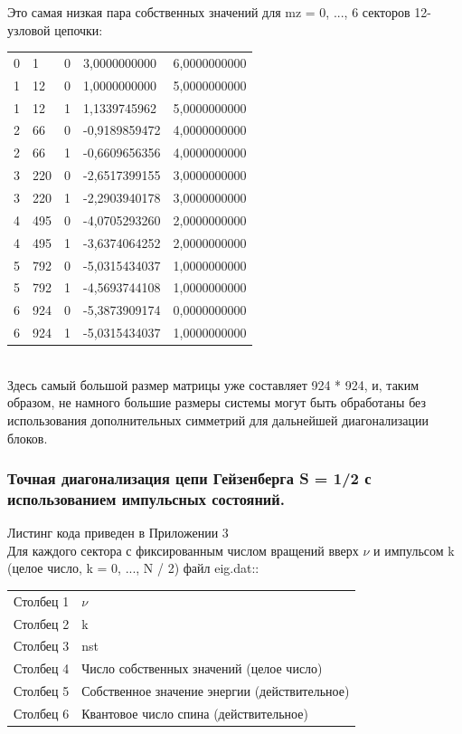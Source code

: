 \documentclass[11pt]{article}
\begin{document}
Это самая низкая пара собственных значений для mz = 0, ..., 6 секторов 12-узловой цепочки: \\
\begin{tabular}{lllll}
    0 & 1 & 0 & 3,0000000000 & 6,0000000000 \\
    1 & 12 & 0 & 1,0000000000 & 5,0000000000 \\
    1 & 12 & 1 & 1,1339745962 & 5,0000000000 \\
    2 & 66 & 0 & -0,9189859472 & 4,0000000000 \\
    2 & 66 & 1 & -0,6609656356 & 4,0000000000 \\
    3 & 220 & 0 & -2,6517399155 & 3,0000000000 \\
    3 & 220 & 1 & -2,2903940178 & 3,0000000000 \\
    4 & 495 & 0 & -4,0705293260 & 2,0000000000 \\
    4 & 495 & 1     & -3,6374064252      & 2,0000000000 \\
    5 & 792 &  0     & -5,0315434037      & 1,0000000000 \\
    5 & 792 &  1     & -4,5693744108      & 1,0000000000 \\
    6 & 924 &  0     & -5,3873909174      & 0,0000000000 \\
	6 & 924 &  1     & -5,0315434037      & 1,0000000000 \\
\end{tabular} \\

Здесь самый большой размер матрицы уже составляет 924 * 924, и, таким образом, не намного большие размеры системы могут быть обработаны без использования дополнительных симметрий для дальнейшей диагонализации блоков.

\subsubsection{Точная диагонализация цепи Гейзенберга S = 1/2 с использованием импульсных состояний.}

Листинг кода приведен в Приложении 3 \\

Для каждого сектора с фиксированным числом вращений вверх $\nu$ и импульсом k (целое число, k = 0, ..., N / 2) файл eig.dat:: \\
\begin{tabular}{ll}
Столбец 1 & $\nu$ \\
Столбец 2 & k \\
Столбец 3 & nst \\
Столбец 4 & Число собственных значений (целое число) \\
Столбец 5 & Собственное значение энергии (действительное) \\
Столбец 6 & Квантовое число спина (действительное) \\
\end{tabular}
\end{document}
